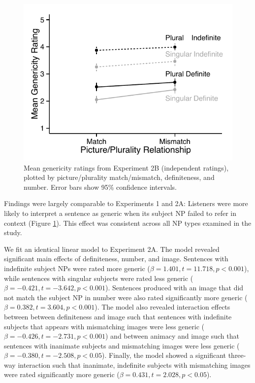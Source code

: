 \documentclass[10pt,letterpaper]{article}
\begin{document}
\begin{figure}[t]
\centering
\includegraphics[width=.9\linewidth]{figures/e2b_mod.pdf}
\caption{\label{fig:e2b} Mean genericity ratings from Experiment 2B (independent ratings), plotted by picture/plurality match/mismatch, definiteness, and number. Error bars show 95\% confidence intervals.} 
\end{figure}

Findings were largely comparable to Experiments 1 and 2A: Listeners were more likely to interpret a sentence as generic when its subject NP failed to refer in context (Figure \ref{fig:e2b}). This effect was consistent across all NP types examined in the study. 

We fit an identical linear model to Experiment 2A. The model revealed significant main effects of definiteness, number, and image. Sentences with indefinite subject NPs were rated more generic (\(\beta = 1.401, t = 11.718, p < 0.001\)), while sentences with singular subjects were rated less generic (\(\beta = -0.421, t = -3.642, p < 0.001\)). Sentences produced with an image that did not match the subject NP in number were also rated significantly more generic (\(\beta = 0.382, t = 3.604, p < 0.001\)). The model also revealed interaction effects between between definiteness and image such that sentences with indefinite subjects that appears with mismatching images were less generic (\(\beta = -0.426, t = -2.731, p < 0.001\)) and between animacy and image such that sentences with inanimate subjects and mismatching images were less generic (\(\beta = -0.380, t=-2.508, p<0.05\)). Finally, the model showed a significant three-way interaction such that inanimate, indefinite subjects with mismatching images were rated significantly more generic (\(\beta = 0.431, t = 2.028, p < 0.05\)). 
\end{document}
